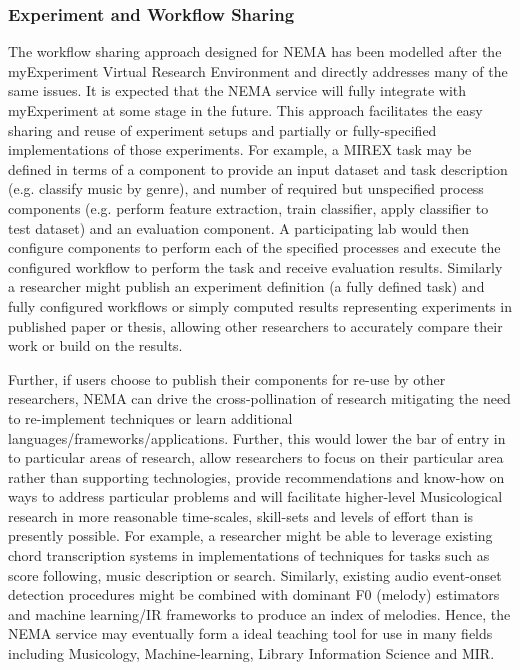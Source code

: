 \documentclass[conference]{IEEEtran}
\begin{document}
\subsubsection{Experiment and Workflow Sharing}
The workflow sharing approach designed for NEMA has been modelled after the myExperiment Virtual Research Environment \cite{de2007designing} and directly addresses many of the same issues. It is expected that the NEMA service will fully integrate with myExperiment at some stage in the future.  This approach facilitates the easy sharing and reuse of experiment setups and partially or fully-specified implementations of those experiments. For example, a MIREX task may be defined in terms of a component to provide an input dataset and task description (e.g. classify music by genre), and number of required but unspecified process components (e.g. perform feature extraction, train classifier, apply classifier to test dataset) and an evaluation component. A participating lab would then configure components to perform each of the specified processes and execute the configured workflow to perform the task and receive evaluation results.  Similarly a researcher might publish an experiment definition (a fully defined task) and fully configured workflows or simply computed results representing experiments in published paper or thesis, allowing other researchers to accurately compare their work or build on the results.

Further, if users choose to publish their components for re-use by other researchers, NEMA can drive the cross-pollination of research mitigating the need to re-implement techniques or learn additional languages/frameworks/applications. Further, this would lower the bar of entry in to particular areas of research, allow researchers to focus on their particular area rather than supporting technologies, provide recommendations and know-how on ways to address particular problems and will facilitate higher-level Musicological research in more reasonable time-scales, skill-sets and levels of effort than is presently possible.   
For example, a researcher might be able to leverage existing chord transcription systems in implementations of techniques for tasks such as score following, music description or search. Similarly, existing audio event-onset detection procedures might be combined with dominant F0 (melody) estimators and machine learning/IR frameworks to produce an index of melodies. 
Hence, the NEMA service may eventually form a ideal teaching tool for use in many fields including Musicology, Machine-learning, Library Information Science and MIR.
\end{document}
